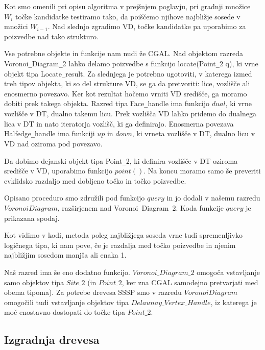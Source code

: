 \documentclass[a4paper, 12pt]{book}
\begin{document}
Kot smo omenili pri opisu algoritma v prejšnjem poglavju, pri gradnji množice $W_i$ točke kandidatke testiramo tako, da poiščemo njihove najbližje sosede v množici $W_{i-1}$. Nad slednjo zgradimo VD, točke kandidatke pa uporabimo za poizvedbe nad tako strukturo.

Vse potrebne objekte in funkcije nam nudi že CGAL. Nad objektom razreda Voronoi\texttt{\_}Diagram\texttt{\_}2 lahko delamo poizvedbe s funkcijo locate(Point\texttt{\_}2 q), ki vrne objekt tipa Locate\texttt{\_}result. Za slednjega je potrebno ugotoviti, v katerega izmed treh tipov objekta, ki so del strukture VD, se ga da pretvoriti: lice, vozlišče ali enosmerno povezavo. Ker kot rezultat hočemo vrniti VD središče, ga moramo dobiti prek takega objekta. Razred tipa Face\texttt{\_}handle ima funkcijo $dual$, ki vrne vozlišče v DT, dualno takemu licu. Prek vozlišča VD lahko pridemo do dualnega lica v DT in nato iteratorja vozlišč, ki ga definirajo. Enosmerna povezava Halfedge\texttt{\_}handle ima funkciji $up$ in $down$, ki vrneta vozlišče v DT, dualno licu v VD nad oziroma pod povezavo.

Da dobimo dejanski objekt tipa Point\texttt{\_}2, ki definira vozlišče v DT oziroma središče v VD, uporabimo funkcijo $point()$. Na koncu moramo samo še preveriti evklidsko razdaljo med dobljeno točko in točko poizvedbe.

Opisano proceduro smo združili pod funkcijo $query$ in jo dodali v našemu razredu $VoronoiDiagram$, razširjenem nad Voronoi\texttt{\_}Diagram\texttt{\_}2. Koda funkcije $query$ je prikazana spodaj.



Kot vidimo v kodi, metoda poleg najbližjega soseda vrne tudi spremenljivko logičnega tipa, ki nam pove, če je razdalja med točko poizvedbe in njenim najbližjim sosedom manjša ali enaka 1. 

Naš razred ima še eno dodatno funkcijo. $Voronoi\texttt{\_}Diagram\texttt{\_}2$ omogoča vstavljanje samo objektov tipa $Site\texttt{\_}2$ (in $Point\texttt{\_}2$, ker zna CGAL samodejno pretvarjati med obema tipoma). Za potrebe drevesa SSSP smo v razredu $VoronoiDiagram$ omogočili tudi vstavljanje objektov tipa $Delaunay\texttt{\_}Vertex\texttt{\_}Handle$, iz katerega je moč enostavno dostopati do točke tipa $Point\texttt{\_}2$.
\subsection{Izgradnja drevesa} 
\end{document}
